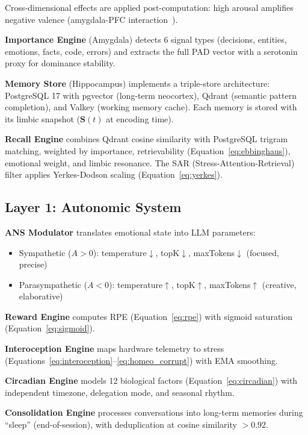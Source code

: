 \documentclass[journal,twoside]{IEEEtran}
\begin{document}
Cross-dimensional effects are applied post-computation: high arousal amplifies negative valence (amygdala-PFC interaction~\cite{ledoux2000}).

\textbf{Importance Engine} (Amygdala) detects 6 signal types (decisions, entities, emotions, facts, code, errors) and extracts the full PAD vector with a serotonin proxy for dominance stability.

\textbf{Memory Store} (Hippocampus) implements a triple-store architecture: PostgreSQL 17 with pgvector (long-term neocortex), Qdrant (semantic pattern completion), and Valkey (working memory cache). Each memory is stored with its limbic snapshot ($\mathbf{S}(t)$ at encoding time).

\textbf{Recall Engine} combines Qdrant cosine similarity with PostgreSQL trigram matching, weighted by importance, retrievability (Equation~\ref{eq:ebbinghaus}), emotional weight, and limbic resonance. The SAR (Stress-Attention-Retrieval) filter applies Yerkes-Dodson scaling (Equation~\ref{eq:yerkes}).

\subsection{Layer 1: Autonomic System}

\textbf{ANS Modulator} translates emotional state into LLM parameters:
\begin{itemize}
    \item Sympathetic ($A > 0$): temperature$\downarrow$, topK$\downarrow$, maxTokens$\downarrow$ (focused, precise)
    \item Parasympathetic ($A < 0$): temperature$\uparrow$, topK$\uparrow$, maxTokens$\uparrow$ (creative, elaborative)
\end{itemize}

\textbf{Reward Engine} computes RPE (Equation~\ref{eq:rpe}) with sigmoid saturation (Equation~\ref{eq:sigmoid}).

\textbf{Interoception Engine} maps hardware telemetry to stress (Equations~\ref{eq:interoception}--\ref{eq:homeo_corrupt}) with EMA smoothing.

\textbf{Circadian Engine} models 12 biological factors (Equation~\ref{eq:circadian}) with independent timezone, delegation mode, and seasonal rhythm.

\textbf{Consolidation Engine} processes conversations into long-term memories during ``sleep'' (end-of-session), with deduplication at cosine similarity $> 0.92$.
\end{document}
